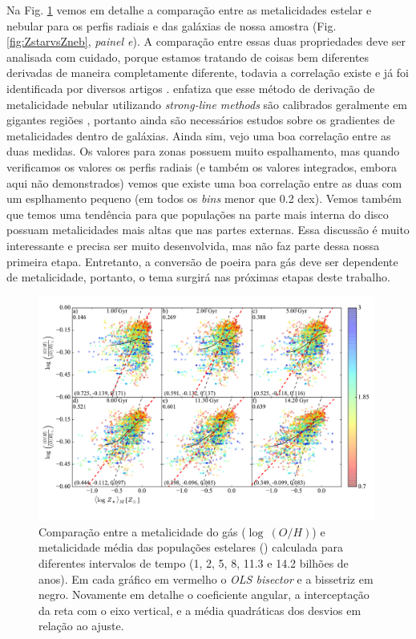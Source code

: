 Na Fig. \ref{fig:compareZR} vemos em detalhe a comparação entre as metalicidades estelar e nebular
para os perfis radiais e das galáxias de nossa amostra (Fig. \ref{fig:ZstarvsZneb}, {\em painel e}).
A comparação entre essas duas propriedades deve ser analisada com cuidado, porque estamos tratando
de coisas bem diferentes derivadas de maneira completamente diferente, todavia a correlação existe e
já foi identificada por diversos artigos \citep{CidFernandes.etal.2005a, Gallazzi.etal.2005a,
CidFernandes.etal.2007a, Asari.etal.2007a}. \citet{Stasinska.etal.2006a} enfatiza que esse método de
derivação de metalicidade nebular utilizando {\em strong-line methods} são calibrados geralmente em
gigantes regiões \Hii, portanto ainda são necessários estudos sobre os gradientes de metalicidades
dentro de galáxias. Ainda sim, vejo uma boa correlação entre as duas medidas. Os valores para zonas
possuem muito espalhamento, mas quando verificamos os valores os perfis radiais (e também os valores
integrados, embora aqui não demonstrados) vemos que existe uma boa correlação entre as duas com um
esplhamento pequeno (em todos os {\em bins} menor que 0.2 dex). Vemos também que temos uma tendência
para que populações na parte mais interna do disco possuam metalicidades mais altas que nas partes
externas. Essa discussão é muito interessante e precisa ser muito desenvolvida, mas não faz parte
dessa nossa primeira etapa. Entretanto, a conversão de poeira para gás deve ser dependente de
metalicidade, portanto, o tema surgirá nas próximas etapas deste trabalho.

\begin{figure}
	\centering
	\includegraphics[width=0.99\textwidth]{figuras/CompareZR.pdf}
	\caption[ vs. $\log\ (O/H)$ - perfis radiais]
	{Comparação entre a metalicidade do gás ($\log\ (O/H)$) e metalicidade média das populações
estelares () calculada para diferentes intervalos de tempo (1, 2, 5, 8, 11.3 e
14.2 bilhões de anos). Em cada gráfico em vermelho o {\em OLS bisector} e a bissetriz em negro.
Novamente em detalhe o coeficiente angular, a interceptação da reta com o eixo vertical, e a média
quadráticas dos desvios em relação ao ajuste.}
	\label{fig:compareZR}
\end{figure}

